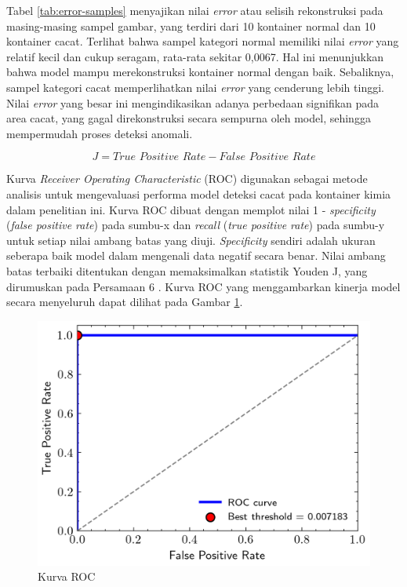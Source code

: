 Tabel \ref{tab:error-samples} menyajikan nilai \textit{error} atau
selisih rekonstruksi pada masing-masing sampel gambar, yang terdiri
dari 10 kontainer normal dan 10 kontainer cacat. Terlihat bahwa
sampel kategori normal memiliki nilai \textit{error} yang relatif
kecil dan cukup seragam, rata-rata sekitar 0,0067. Hal ini
menunjukkan bahwa model mampu merekonstruksi kontainer normal dengan
baik. Sebaliknya, sampel kategori cacat memperlihatkan nilai
\textit{error} yang cenderung lebih tinggi. Nilai \textit{error} yang
besar ini mengindikasikan adanya perbedaan signifikan pada area
cacat, yang gagal direkonstruksi secara sempurna oleh model, sehingga
mempermudah proses deteksi anomali.

\begin{equation}
  J = \textit{True Positive Rate} - \textit{False Positive Rate}
\end{equation}

Kurva \textit{Receiver Operating Characteristic} (ROC) digunakan
sebagai metode analisis untuk mengevaluasi performa model deteksi
cacat pada kontainer kimia dalam penelitian ini. Kurva ROC dibuat
dengan memplot nilai 1 - \textit{specificity} (\textit{false positive
rate}) pada sumbu-x dan \textit{recall} (\textit{true positive rate})
pada sumbu-y untuk setiap nilai ambang batas yang diuji.
\textit{Specificity} sendiri adalah ukuran seberapa baik model dalam
mengenali data negatif secara benar. Nilai ambang batas
terbaiki ditentukan dengan memaksimalkan statistik Youden J, yang
dirumuskan pada Persamaan 6
\citep{28}. Kurva ROC yang menggambarkan kinerja model secara
menyeluruh dapat dilihat pada Gambar \ref{fig:roc}.

\begin{figure}[H]
  \centering
  \includegraphics[width=\textwidth]{gambar/roc.png}
  \caption{Kurva ROC}
  \label{fig:roc}
\end{figure}
\vspace{-1em}

